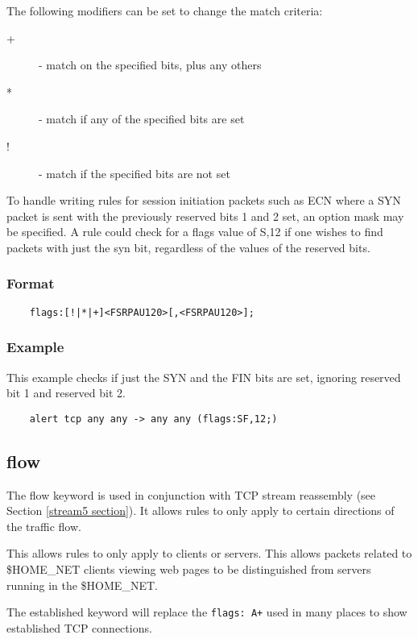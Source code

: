 \documentclass[english]{report}
\begin{document}
The following modifiers can be set to change the match criteria:

\begin{description}
\item [+] - match on the specified bits, plus any others
\item [*] - match if any of the specified bits are set
\item [!] - match if the specified bits are not set
\end{description}

To handle writing rules for session initiation packets such as ECN where a SYN
packet is sent with the previously reserved bits 1 and 2 set, an option mask
may be specified. A rule could check for a flags value of S,12 if one wishes to
find packets with just the syn bit, regardless of the values of the reserved
bits.

\subsubsection{Format}

\begin{verbatim}
    flags:[!|*|+]<FSRPAU120>[,<FSRPAU120>];
\end{verbatim}

\subsubsection{Example}

This example checks if just the SYN and the FIN bits are set, ignoring reserved
bit 1 and reserved bit 2.

\begin{verbatim}
    alert tcp any any -> any any (flags:SF,12;)
\end{verbatim}

\subsection{flow}
\label{flow section}

The flow keyword is used in conjunction with TCP stream reassembly (see Section
\ref{stream5 section}). It allows rules to only apply to certain directions of
the traffic flow. 

This allows rules to only apply to clients or servers. This allows packets
related to \$HOME\_NET clients viewing web pages to be distinguished from
servers running in the \$HOME\_NET.

The established keyword will replace the \texttt{flags: A+} used in many places
to show established TCP connections.
\end{document}
